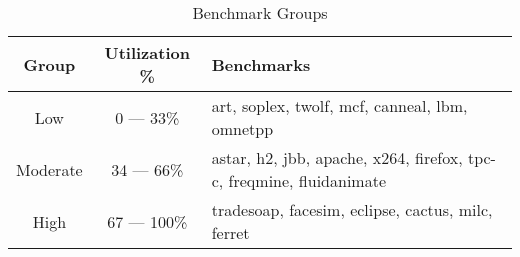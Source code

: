 \begin{table}[!htb]
\vspace{-10pt}
\begin{center}
\caption{Benchmark Groups}
\label{table:benchmark_categories}
{
  \begin{tabular}{ |@{~}c@{~}|@{~}c@{~}|@{~}p{}@{~}|}
    \hline
    Group & Utilization \% & Benchmarks \\
    \hline
    Low        & 0 --- 33\% & art, soplex, twolf, mcf, canneal, lbm, omnetpp \\
    \hline
    Moderate   & 34 --- 66\% & astar, h2, jbb, apache, x264, firefox, tpc-c, freqmine, fluidanimate \\
    \hline
    High       & 67 --- 100\% & tradesoap, facesim, eclipse, cactus, milc, ferret \\
    \hline
  \end{tabular}
 }
\end{center}
\end{table}
